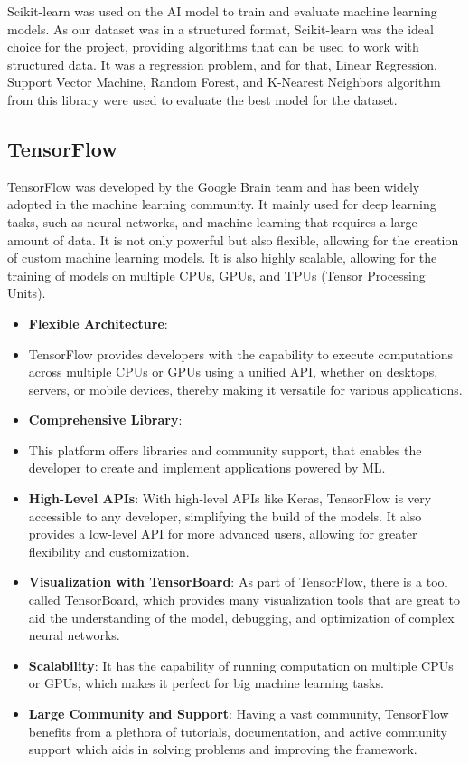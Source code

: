 Scikit-learn was used on the AI model to train and evaluate machine learning models. As our dataset was in a structured format, Scikit-learn was the ideal choice for the project, 
providing algorithms that can be used to work with structured data. It was a regression problem, and for that, Linear Regression, Support Vector Machine,
Random Forest, and K-Nearest Neighbors algorithm from this library were used to evaluate the best model for the dataset.

\subsection{TensorFlow}

TensorFlow was developed by the Google Brain team and has been widely adopted in the machine learning community. It mainly used for deep learning tasks, such as neural networks, and machine
learning that requires a large amount of data. It is not only powerful but also flexible, allowing for the creation of custom machine learning models. It is also highly scalable, allowing for 
the training of models on multiple CPUs, GPUs, and TPUs (Tensor Processing Units).\cite{tensorflow}

\begin{itemize}
    \item \textbf{Flexible Architecture}: 
    \item TensorFlow provides developers with the capability to execute computations across multiple CPUs or GPUs using a unified API, whether on desktops, servers, or mobile devices, thereby making it versatile for various applications.
    \item \textbf{Comprehensive Library}: 
    \item This platform offers libraries and community support, that enables the developer to create and implement applications powered by ML.
    \item \textbf{High-Level APIs}: With high-level APIs like Keras, TensorFlow is very accessible to any developer, simplifying the build of the models. It also provides a low-level API for more advanced users, allowing for greater flexibility and customization.
    \item \textbf{Visualization with TensorBoard}: As part of TensorFlow, there is a tool called TensorBoard, which provides many visualization tools that are great to aid the understanding
    of the model, debugging, and optimization of complex neural networks.
    \item \textbf{Scalability}: It has the capability of running computation on multiple CPUs or GPUs, which makes it perfect for big machine learning tasks.
    \item \textbf{Large Community and Support}: Having a vast community, TensorFlow benefits from a plethora of tutorials, documentation, and active community support which aids in solving problems and improving the framework.
\end{itemize}

